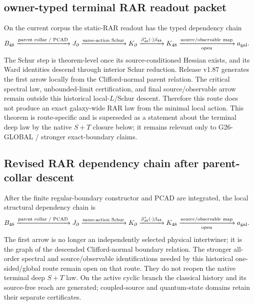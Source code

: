 \documentclass[12pt,a4paper]{article}
\begin{document}
\subsection{owner-typed terminal RAR readout packet}
\label{p9:sec:v149-owner-typed-rar-readout}

\begin{theorem}
\label{p9:thm:v149-complete-rar-readout-chain}
On the current corpus the static-RAR readout has the typed dependency chain
\[
 B_{48}
 \xrightarrow{\text{parent collar / PCAD}}
 J_\partial
 \xrightarrow{\text{same-action Schur}}
 K_\partial
 \xrightarrow{\beta_{48}^{*}(\cdot)\beta_{48}}
 K_{48}
 \xrightarrow[\text{open}]{\text{source/observable map}}
 a_{\rm gal}.
\]
The Schur step is theorem-level once its source-conditioned Hessian exists, and
its Ward identities descend through interior Schur reduction.  Release v1.87
generates the first arrow locally from the Clifford-normal parent relation.
The critical spectral law, unbounded-limit certification, and final
source/observable arrow remain outside this historical local-$L$/Schur
descent.  Therefore this route does not produce an exact galaxy-wide RAR law
from the minimal local action.  This theorem is route-specific and is
superseded as a statement about the terminal deep law by the native $S+T$
closure below; it remains relevant only to G26-GLOBAL / stronger exact-boundary
claims.
\end{theorem}

\subsection{Revised RAR dependency chain after parent-collar descent}
\label{p9:sec:v187-revised-rar-chain}

\begin{theorem}
\label{p9:thm:v187-local-structural-rar-chain}
After the finite regular-boundary constructor and PCAD are integrated, the
local structural dependency chain is
\[
 B_{48}
 \xrightarrow{\text{parent collar / PCAD}}
 J_\partial
 \xrightarrow{\text{same-action Schur}}
 K_\partial
 \xrightarrow{\beta_{48}^{*}(\cdot)\beta_{48}}
 K_{48}
 \xrightarrow[\text{open}]{\text{source/observable map}}
 a_{\rm gal}.
\]
The first arrow is no longer an independently selected physical intertwiner;
it is the graph of the descended Clifford-normal boundary relation.  The
stronger all-order spectral and source/observable identifications needed
by this historical one-sided/global route remain open on that route.  They
do not reopen the native terminal deep $S+T$ law.  On the active cyclic
branch the classical history and its source-free reach are generated;
coupled-source and quantum-state domains retain their separate certificates.
\end{theorem}
\end{document}
